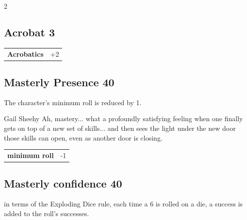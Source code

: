 \begin{multicols}{2}
\begin{tcolorbox}
\end{tcolorbox}

\begin{tcolorbox}
    \subsection*{Acrobat \hfill \small{3 }}
    \tcblower




\begin{tabular}{@{}ll@{}}
    \textbf{Acrobatics} & +2\\
\end{tabular}


\end{tcolorbox}

\begin{tcolorbox}
    \subsection*{Masterly Presence \hfill \small{40 }}
    \tcblower
The character's minimum roll is reduced by 1.

\begin{pquote}{Gail Sheehy}
Ah, mastery... what a profoundly satisfying feeling when one finally gets on top of a new set of skills... and then sees the light under the new door those skills can open, even as another door is closing.
\end{pquote}

\vspace{3mm}

\begin{tabular}{@{}ll@{}}
    \textbf{minimum roll} & -1\\
\end{tabular}


\end{tcolorbox}

\begin{tcolorbox}
    \subsection*{Masterly confidence \hfill \small{40 }}
    \tcblower
in terms of the Exploding Dice rule, each time a 6 is rolled on a die, a success is added to the roll's successes.


\end{tcolorbox}
\end{multicols}
